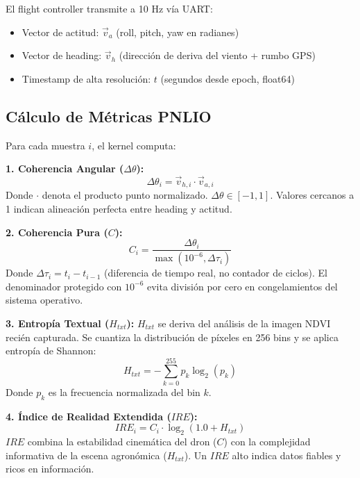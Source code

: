 El flight controller transmite a 10 Hz vía UART:

\begin{itemize}
    \item Vector de actitud: $\vec{v}_a$ (roll, pitch, yaw en radianes)
    \item Vector de heading: $\vec{v}_h$ (dirección de deriva del viento + rumbo GPS)
    \item Timestamp de alta resolución: $t$ (segundos desde epoch, float64)
\end{itemize}

\subsection{Cálculo de Métricas PNLIO}

Para cada muestra $i$, el kernel computa:

\textbf{1. Coherencia Angular ($\Delta\theta$):}
\begin{equation}
\Delta\theta_i = \vec{v}_{h,i} \cdot \vec{v}_{a,i}
\end{equation}
Donde $\cdot$ denota el producto punto normalizado. $\Delta\theta \in [-1, 1]$. Valores cercanos a 1 indican alineación perfecta entre heading y actitud.

\textbf{2. Coherencia Pura ($C$):}
\begin{equation}
C_i = \frac{\Delta\theta_i}{\max(10^{-6}, \Delta\tau_i)}
\end{equation}
Donde $\Delta\tau_i = t_i - t_{i-1}$ (diferencia de tiempo real, no contador de ciclos). El denominador protegido con $10^{-6}$ evita división por cero en congelamientos del sistema operativo.

\textbf{3. Entropía Textual ($H_{txt}$):}
$H_{txt}$ se deriva del análisis de la imagen NDVI recién capturada. Se cuantiza la distribución de píxeles en 256 bins y se aplica entropía de Shannon:
\begin{equation}
H_{txt} = -\sum_{k=0}^{255} p_k \log_2(p_k)
\end{equation}
Donde $p_k$ es la frecuencia normalizada del bin $k$.

\textbf{4. Índice de Realidad Extendida ($IRE$):}
\begin{equation}
IRE_i = C_i \cdot \log_2(1.0 + H_{txt})
\end{equation}
$IRE$ combina la estabilidad cinemática del dron ($C$) con la complejidad informativa de la escena agronómica ($H_{txt}$). Un $IRE$ alto indica datos fiables y ricos en información.

